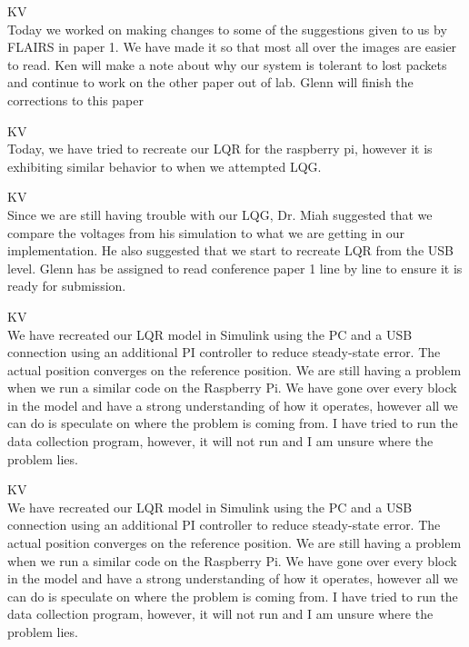 \documentclass[fontsize=11pt, %
                             paper=letter, %
                             openany, %
                             captions=tableheading,
                             index=totoc,
                             hyperref]{labbook}
\begin{document}
\begin{addmargin}[0cm]{0cm}
KV\\
Today we worked on making changes to some of the suggestions given to us by FLAIRS in paper 1.  We have made it so that most all over the images are easier to read. Ken will make a note about why our system is tolerant to lost packets and continue to work on the other paper out of lab.  Glenn will finish the corrections to this paper


KV\\
Today, we have tried to recreate our LQR for the raspberry pi, however it is exhibiting similar behavior to when we attempted LQG.

KV\\
Since we are still having trouble with our LQG, Dr. Miah suggested that we compare the voltages from his simulation to what we are getting in our implementation.  He also suggested that we start to recreate LQR from the USB level.  Glenn has be assigned to read conference paper 1 line by line to ensure it is ready for submission. 

KV\\
We have recreated our LQR model in Simulink using the PC and a USB connection using an additional PI controller to reduce steady-state error.  The actual position converges on the reference position.  We are still having a problem when we run a similar code on the Raspberry Pi.  We have gone over every block in the model and have a strong understanding of how it operates, however all we can do is speculate on where the problem is coming from.  I have tried to run the data collection program, however, it will not run and I am unsure where the problem lies.

KV\\
We have recreated our LQR model in Simulink using the PC and a USB connection using an additional PI controller to reduce steady-state error.  The actual position converges on the reference position.  We are still having a problem when we run a similar code on the Raspberry Pi.  We have gone over every block in the model and have a strong understanding of how it operates, however all we can do is speculate on where the problem is coming from.  I have tried to run the data collection program, however, it will not run and I am unsure where the problem lies.


\end{addmargin}
\end{document}
